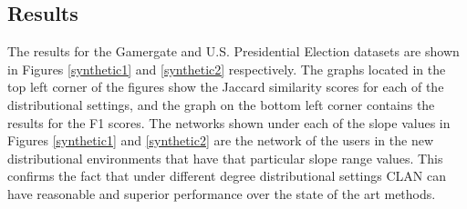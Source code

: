 \subsection{Results}
The results for the Gamergate and U.S. Presidential Election datasets are  shown in Figures \ref{synthetic1} and \ref{synthetic2} respectively. The graphs located in the top left corner of the figures show the Jaccard similarity scores for each of the distributional settings, and the graph on the bottom left corner contains the results for the F1 scores.  The networks shown under each of the slope values in Figures \ref{synthetic1} and \ref{synthetic2} are the network of the users in the new distributional environments that have that particular slope range values. This confirms the fact that under different degree distributional settings CLAN can have reasonable and superior performance over the state of the art methods.